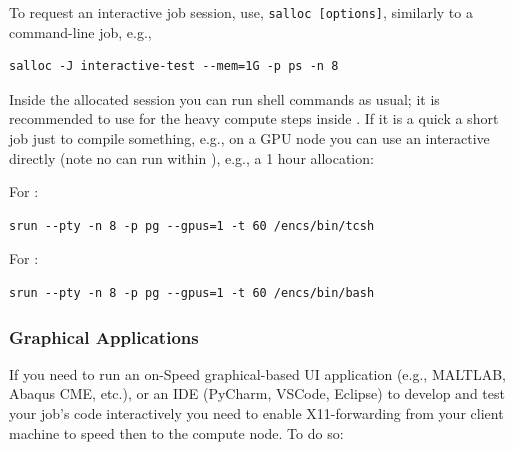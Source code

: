 To request an interactive job 
session, use, \texttt{salloc [options]}, similarly to a 
 command-line job, e.g.,
%
\begin{verbatim}
salloc -J interactive-test --mem=1G -p ps -n 8
\end{verbatim}
%
%
Inside the allocated  session you can run shell
commands as usual; it is recommended to use  for
the heavy compute steps inside .
%
If it is a quick a short job just to compile something, e.g., on
a GPU node you can use an interactive  directly
(note no  can run within ), e.g., a 1 hour
allocation:

For :
\begin{verbatim}
srun --pty -n 8 -p pg --gpus=1 -t 60 /encs/bin/tcsh
\end{verbatim}

For :
\begin{verbatim}
srun --pty -n 8 -p pg --gpus=1 -t 60 /encs/bin/bash
\end{verbatim}

\subsubsection{Graphical Applications}

If you need to run an on-Speed graphical-based UI application (e.g., MALTLAB,
Abaqus CME, etc.), or an IDE (PyCharm, VSCode, Eclipse)
to develop and test your job's code interactively you need to enable
X11-forwarding from your client machine to speed then to the compute node.
To do so:

